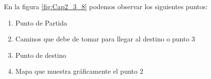 \hspace*{1cm}En la figura \ref {fig:Cap2_3_8}  podemos observar los siguientes puntos:\\
 \begin{enumerate}
    \item Punto de Partida
    \item Caminos que debe de tomar para llegar al destino o punto 3
    \item Punto de destino
    \item Mapa que muestra gráficamente el punto 2
 \end{enumerate}


